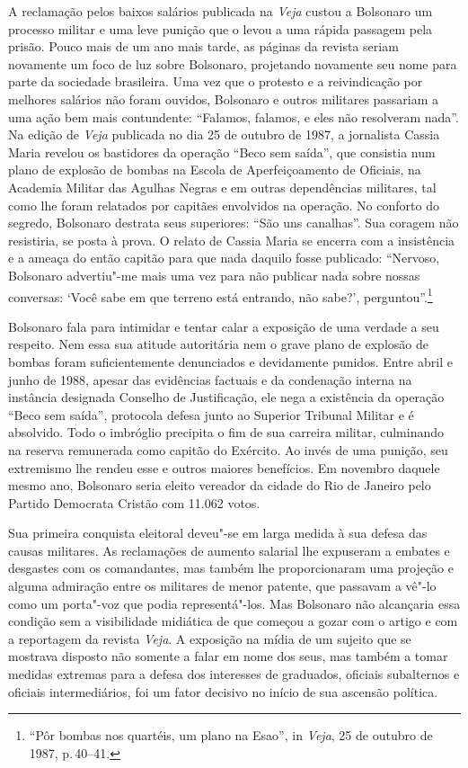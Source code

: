 A reclamação pelos baixos salários publicada na \emph{Veja} custou a
Bolsonaro um processo militar e uma leve punição que o levou a uma
rápida passagem pela prisão. Pouco mais de um ano mais tarde, as páginas
da revista seriam novamente um foco de luz sobre Bolsonaro, projetando
novamente seu nome para parte da sociedade brasileira. Uma vez que o
protesto e a reivindicação por melhores salários não foram ouvidos,
Bolsonaro e outros militares passariam a uma ação bem mais contundente:
``Falamos, falamos, e eles não resolveram nada''. Na edição de
\emph{Veja} publicada no dia 25 de outubro de 1987, a jornalista Cassia
Maria revelou os bastidores da operação ``Beco sem saída'', que
consistia num plano de explosão de bombas na Escola de Aperfeiçoamento
de Oficiais, na Academia Militar das Agulhas Negras e em outras
dependências militares, tal como lhe foram relatados por capitães
envolvidos na operação. No conforto do segredo, Bolsonaro destrata seus
superiores: ``São uns canalhas''. Sua coragem não resistiria, se posta à
prova. O relato de Cassia Maria se encerra com a insistência e a ameaça
do então capitão para que nada daquilo fosse publicado: ``Nervoso,
Bolsonaro advertiu"-me mais uma vez para não publicar nada sobre nossas
conversas: `Você sabe em que terreno está entrando, não sabe?',
perguntou''.\footnote{``Pôr bombas nos quartéis, um plano na Esao'', in
  \emph{Veja}, 25 de outubro de 1987, p.\,40--41.}

Bolsonaro fala para intimidar e tentar calar a exposição de uma verdade
a seu respeito. Nem essa sua atitude autoritária nem o grave plano de
explosão de bombas foram suficientemente denunciados e devidamente
punidos. Entre abril e junho de 1988, apesar das evidências factuais e
da condenação interna na instância designada Conselho de Justificação,
ele nega a existência da operação ``Beco sem saída'', protocola defesa
junto ao Superior Tribunal Militar e é absolvido. Todo o imbróglio
precipita o fim de sua carreira militar, culminando na reserva
remunerada como capitão do Exército. Ao invés de uma punição, seu
extremismo lhe rendeu esse e outros maiores benefícios. Em novembro
daquele mesmo ano, Bolsonaro seria eleito vereador da cidade do Rio de
Janeiro pelo Partido Democrata Cristão com 11.062 votos.

Sua primeira conquista eleitoral deveu"-se em larga medida à sua defesa
das causas militares. As reclamações de aumento salarial lhe expuseram a
embates e desgastes com os comandantes, mas também lhe proporcionaram
uma projeção e alguma admiração entre os militares de menor patente, que
passavam a vê"-lo como um porta"-voz que podia representá"-los. Mas
Bolsonaro não alcançaria essa condição sem a visibilidade midiática de
que começou a gozar com o artigo e com a reportagem da revista
\emph{Veja}. A exposição na mídia de um sujeito que se mostrava disposto
não somente a falar em nome dos seus, mas também a tomar medidas
extremas para a defesa dos interesses de graduados, oficiais subalternos
e oficiais intermediários, foi um fator decisivo no início de sua
ascensão política.

